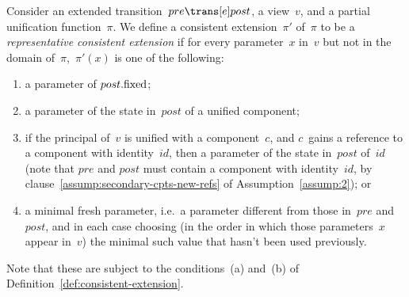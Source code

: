 
\begin{definition}
\label{def:representative-consistent-extension}
Consider an extended transition~$pre \trans[e] post$, a view~$v$, and a
partial unification function~$\pi$.  We define a consistent extension~$\pi'$
of~$\pi$ to be a \emph{representative consistent extension} if for every
parameter~$x$ in~$v$ but not in the domain of~$\pi$,\, $\pi'(x)$ is one of the
following:
%
\begin{enumerate}
\item\label{clause:remap-1} a parameter of $post.\mathrm{fixed}$; 

\item\label{clause:remap-2} a parameter of the state in~$post$ of a unified
  component;

\item\label{clause:remap-3} if the principal of~$v$ is unified with a
  component~$c$, and $c$~gains a reference to a component with identity~$id$,
  then a parameter of the state in~$post$ of~$id$ (note that $pre$ and $post$
  must contain a component with identity~$id$, by
  clause~\ref{assump:secondary-cpts-new-refs} of Assumption~\ref{assump:2}); or

\item\label{clause:remap-4} a minimal fresh parameter, i.e.~a parameter
  different from those in~$pre$ and~$post$, and in each case choosing (in the
  order in which those parameters~$x$ appear in~$v$) the minimal such value
  that hasn't been used previously. 
\end{enumerate}
%
%
Note that these are subject to the conditions~(a) and~(b) of
Definition~\ref{def:consistent-extension}. 
\end{definition}
%


